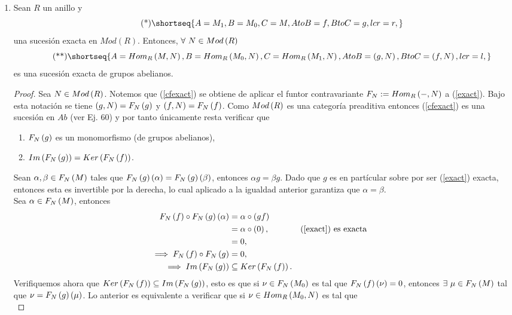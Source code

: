 \documentclass{article}
\begin{document}
\begin{enumerate}[label=\textbf{Ej \arabic*.}]
		\item Sean $R$ un anillo y \begin{equation*}\tag{*}\label{exact}
			\shortseq{A=M_1,B=M_0,C=M, AtoB=f, BtoC=g,lcr=r,}
		\end{equation*} una sucesión exacta en $Mod(R)$. Entonces, $\forall\ N\in Mod\left(R\right)$
		\begin{equation*}\tag{**}\label{cfexact}
			\shortseq{A=\functhom{M}{N}{R},B=\functhom{M_0}{N}{R},C=\functhom{M_1}{N}{R}, AtoB=\lrprth{g,N}, BtoC=\lrprth{f,N},lcr=l,}
		\end{equation*}
		es una sucesión exacta de grupos abelianos.
		\begin{proof}
			Sea $N\in Mod\left(R\right)$. Notemos que (\ref{cfexact}) se obtiene de aplicar el funtor contravariante $F_N:=\functhom{}{N}{R}$ a (\ref{exact}). Bajo esta notación se tiene $(g,N)=F_N\left(g\right)$ y $\left(f,N\right)=F_N\left(f\right)$. Como $Mod\left(R\right)$ es una categoría preaditiva entonces (\ref{cfexact}) es una sucesión en $Ab$ (ver Ej. 60) y por tanto únicamente resta verificar que 
			\begin{enumerate}
				\item $F_N\left(g\right)$ es un monomorfismo (de grupos abelianos),
				\item $Im\left(F_N\left(g\right)\right)=Ker\left(F_N\left(f\right)\right)$.
			\end{enumerate}
			 Sean $\alpha,\beta\in F_N\left(M\right)$ tales que $F_N\left(g\right)\left(\alpha\right)=F_N\left(g\right)\left(\beta\right)$, entonces 
			$\alpha g=\beta g$. Dado que $g$ es en partícular sobre por ser (\ref{exact}) exacta, entonces esta es invertible por la derecha, lo cual aplicado a la igualdad anterior garantiza que $\alpha=\beta$. \\
			 Sea $\alpha\in F_N\left(M\right)$, entonces 
			\begin{align*}
				F_N\left(f\right)\circ F_N\left(g\right)\left(\alpha\right)&=\alpha\circ\left(gf\right)\\
				&=\alpha\circ\left(0\right), && (\ref{exact})\text{ es exacta}\\
				&=0,\\
				\implies F_N\left(f\right)\circ F_N\left(g\right)&=0,\\
				\implies Im\left(F_N\left(g\right)\right)&\subseteq Ker\left(F_N\left(f\right)\right).
			\end{align*}
			Verifiquemos ahora que $Ker\left(F_N\left(f\right)\right)\subseteq Im\left(F_N\left(g\right)\right)$, esto es que si $\nu\in F_N\left(M_0\right)$ es tal que $F_N\left(f\right)\left(\nu\right)=0$, entonces $\exists\ \mu\in F_N\left(M\right)$ tal que $\nu=F_N\left(g\right)\left(\mu\right)$. Lo anterior es equivalente a verificar que si $\nu\in\functhom{M_0}{N}{R}$ es tal que \begin{equation*}\tag{I}\label{kernelement}

\end{equation*}
\end{proof}
\end{enumerate}
\end{document}
